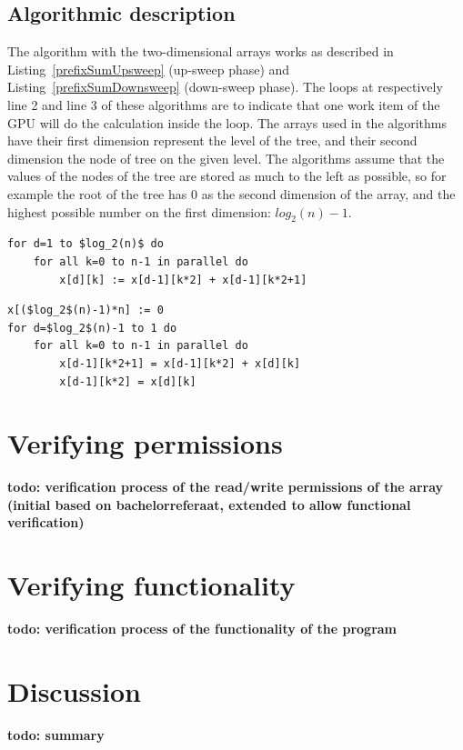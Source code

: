 \documentclass[a4paper]{article}
\newcommand{\todo}[1]{{\color{BurntOrange}\sffamily\textbf{todo: #1}\par}}
\begin{document}
\subsection{Algorithmic description} \label{sec:implAlgorithmic}
The algorithm with the two-dimensional arrays works as described in Listing~\ref{prefixSumUpsweep} (up-sweep phase) and Listing~\ref{prefixSumDownsweep} (down-sweep phase). The loops at respectively line 2 and line 3 of these algorithms are to indicate that one work item of the GPU will do the calculation inside the loop. The arrays used in the algorithms have their first dimension represent the level of the tree, and their second dimension the node of tree on the given level. The algorithms assume that the values of the nodes of the tree are stored as much to the left as possible, so for example the root of the tree has 0 as the second dimension of the array, and the highest possible number on the first dimension: $log_2(n)-1$.

\begin{lstlisting}[caption=Upsweep phase, label=prefixSumUpsweep, float=htpb]
for d=1 to $log_2(n)$ do
	for all k=0 to n-1 in parallel do 
		x[d][k] := x[d-1][k*2] + x[d-1][k*2+1]
\end{lstlisting}

\begin{lstlisting}[caption=Downsweep phase, label=prefixSumDownsweep, float=htpb]
x[($log_2$(n)-1)*n] := 0
for d=$log_2$(n)-1 to 1 do
	for all k=0 to n-1 in parallel do
		x[d-1][k*2+1] = x[d-1][k*2] + x[d][k]
		x[d-1][k*2] = x[d][k]
\end{lstlisting}
\FloatBarrier


\section{Verifying permissions}
\todo{verification process of the read/write permissions of the array (initial based on bachelorreferaat, extended to allow functional verification)}


\section{Verifying functionality}
\todo{verification process of the functionality of the program}


\section{Discussion}
\todo{summary}
\end{document}
